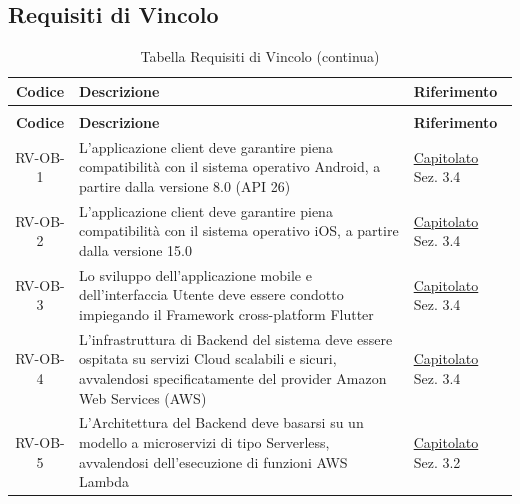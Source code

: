 \documentclass[a4paper,12pt]{article}
\begin{document}
\subsection{Requisiti di Vincolo} \label{subsection:requisiti_vincolo}
\begin{center}
\renewcommand{\arraystretch}{1.5}
\begin{longtable}{|c|p{8.5cm}|>{\centering\arraybackslash}p{4cm}|}

\hline
\rowcolor{gray!60}
\textbf{Codice} & \textbf{Descrizione} & \textbf{Riferimento} \\
\hline
\endfirsthead
\caption[]{Tabella Requisiti di Vincolo (continua)} \\
\hline
\rowcolor{gray!60}
\textbf{Codice} & \textbf{Descrizione} & \textbf{Riferimento} \\
\hline
\endhead
\rowcolor{white}
RV-OB-1 & L'applicazione client deve garantire piena compatibilità con il sistema operativo Android, a partire dalla versione 8.0 (API 26) & \href{https://www.math.unipd.it/~tullio/IS-1/2025/Progetto/C4.pdf}{Capitolato} \newline Sez. 3.4 \\
\hline
\rowcolor{gray!20}
RV-OB-2 & L'applicazione client deve garantire piena compatibilità con il sistema operativo iOS, a partire dalla versione 15.0 & \href{https://www.math.unipd.it/~tullio/IS-1/2025/Progetto/C4.pdf}{Capitolato} \newline Sez. 3.4 \\
\hline
\rowcolor{white}
RV-OB-3 & Lo sviluppo dell'applicazione mobile e dell'interfaccia Utente deve essere condotto impiegando il Framework cross-platform Flutter & \href{https://www.math.unipd.it/~tullio/IS-1/2025/Progetto/C4.pdf}{Capitolato} \newline Sez. 3.4 \\
\hline
\rowcolor{gray!20}
RV-OB-4 & L'infrastruttura di Backend del sistema deve essere ospitata su servizi Cloud scalabili e sicuri, avvalendosi specificatamente del provider Amazon Web Services (AWS) & \href{https://www.math.unipd.it/~tullio/IS-1/2025/Progetto/C4.pdf}{Capitolato} \newline Sez. 3.4 \\
\hline
\rowcolor{white}
RV-OB-5 & L'Architettura del Backend deve basarsi su un modello a microservizi di tipo Serverless, avvalendosi dell'esecuzione di funzioni AWS Lambda & \href{https://www.math.unipd.it/~tullio/IS-1/2025/Progetto/C4.pdf}{Capitolato} \newline Sez. 3.2 \\

\end{longtable}
\end{center}
\end{document}
